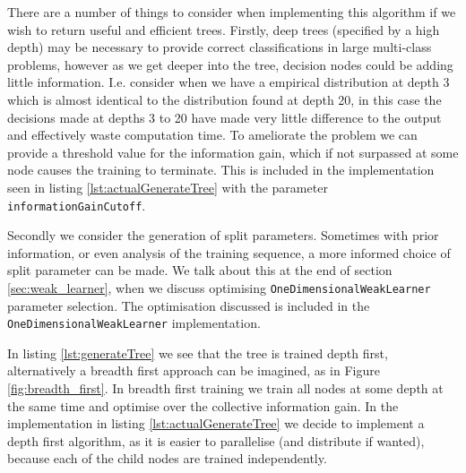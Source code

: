 \documentclass[12pt,twoside,notitlepage]{report}
\begin{document}
          There are a number of things to consider when implementing this algorithm if we wish to return useful and 
          efficient trees. Firstly, deep trees (specified by a high depth) may be necessary to provide correct 
          classifications in large multi-class problems, however as we get deeper into the tree, decision nodes could 
          be adding little information. I.e. consider when we have a empirical distribution at depth 
          3 which is almost identical to the distribution found 
          at depth 20, in this case the decisions made at depths 3 to 20 have made very little difference to the output 
          and effectively waste computation time. To ameliorate the problem we can provide a threshold value for the 
          information gain, which if not surpassed at some node causes the training to terminate. This is included in 
          the implementation seen in listing \ref{lst:actualGenerateTree} with the parameter \texttt{informationGainCutoff}. 

          Secondly we consider the generation of split parameters. Sometimes with prior information, or even analysis 
          of the training sequence, a more informed choice of split parameter can be made. We talk about this at the 
          end of section \ref{sec:weak_learner}, when we discuss optimising \texttt{OneDimensionalWeakLearner} parameter 
          selection. The optimisation discussed is included in the \texttt{OneDimensionalWeakLearner} implementation.

          In listing \ref{lst:generateTree} we see that the tree is trained depth first, 
          alternatively a breadth first approach can be imagined, as in Figure \ref{fig:breadth_first}. In breadth first 
          training we train all nodes at some depth at the 
          same time and optimise over the collective information gain. In the implementation in listing
          \ref{lst:actualGenerateTree} we decide to implement a depth first algorithm, as it is easier to parallelise 
          (and distribute if wanted), because each of the child nodes are trained independently.
\end{document}
